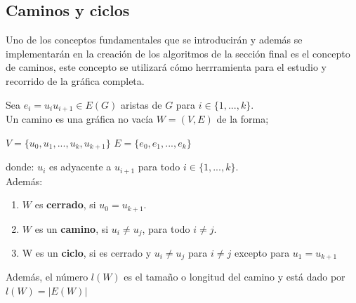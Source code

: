  \subsection{Caminos y ciclos}
 Uno de los conceptos fundamentales que se introducirán y además se implementarán en la creación de los algoritmos de la sección final es el concepto de caminos, este concepto se utilizará cómo herrramienta para el estudio y recorrido de la gráfica completa.

 \begin{definition}
    
     Sea $e_i = u_iu_{i+1} \in E(G)$ aristas de $G$ para $i \in \{1,...,k\}$. \\
     Un camino es una gráfica no vacía $W = (V,E)$ de la forma;
     \begin{center}
         $V = \{u_0,u_1,...,u_k,u_{k+1}\}$ \hspace{5pt} $E= \{e_0,e_1,...,e_k\}$
     \end{center}
     donde:
     $u_i$ es adyacente a $u_{i+1}$
     para todo $i \in \{1,...,k\}$.\\
     Además:
     \begin{enumerate}
         \item $W$ es \textbf{cerrado}, si $u_0 =u_{k+1}$.
         \item $W$ es un \textbf{camino}, si $u_i \neq u_j$, para todo $i \neq j$.
         \item W es un \textbf{ciclo}, si es cerrado y $u_i \neq u_j$ para $i \neq j$ excepto para $u_1 = u_{k+1}$
         
     \end{enumerate}
     
     Además, el número $l(W)$ es el tamaño o longitud del camino y está dado por $l(W)=|E(W)|$
 \end{definition}

